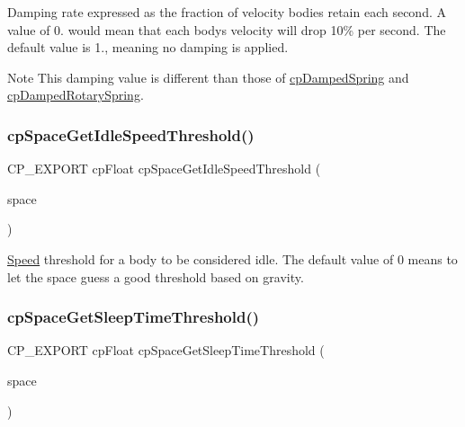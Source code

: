 Damping rate expressed as the fraction of velocity bodies retain each second. A value of 0. would mean that each body\textquotesingle{}s velocity will drop 10\% per second. The default value is 1., meaning no damping is applied. \begin{DoxyNote}{Note}
This damping value is different than those of \hyperlink{structcpDampedSpring}{cp\+Damped\+Spring} and \hyperlink{structcpDampedRotarySpring}{cp\+Damped\+Rotary\+Spring}. 
\end{DoxyNote}
\mbox{\label{group__cpSpace_ga256c38475826c4c165999079929fe1e7}} 
\subsubsection{\texorpdfstring{cp\+Space\+Get\+Idle\+Speed\+Threshold()}{cpSpaceGetIdleSpeedThreshold()}}
{\footnotesize\ttfamily C\+P\+\_\+\+E\+X\+P\+O\+RT cp\+Float cp\+Space\+Get\+Idle\+Speed\+Threshold (\begin{DoxyParamCaption}\item[{const \hyperlink{structcpSpace}{cp\+Space} $\ast$}]{space }\end{DoxyParamCaption})}

\hyperlink{classSpeed}{Speed} threshold for a body to be considered idle. The default value of 0 means to let the space guess a good threshold based on gravity. \mbox{\label{group__cpSpace_gab3f74ae04501ce532913c87e5be54a80}} 
\subsubsection{\texorpdfstring{cp\+Space\+Get\+Sleep\+Time\+Threshold()}{cpSpaceGetSleepTimeThreshold()}}
{\footnotesize\ttfamily C\+P\+\_\+\+E\+X\+P\+O\+RT cp\+Float cp\+Space\+Get\+Sleep\+Time\+Threshold (\begin{DoxyParamCaption}\item[{const \hyperlink{structcpSpace}{cp\+Space} $\ast$}]{space }\end{DoxyParamCaption})}

